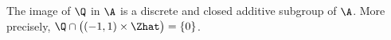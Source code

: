The image of $\Q$ in $\A$ is a discrete and closed additive subgroup of $\A$. More precisely,
$\Q\cap\bigl((-1,1)\times\Zhat\bigr)=\{0\}$.
